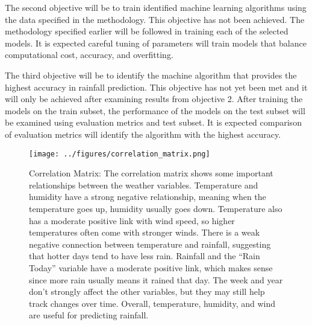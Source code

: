 \documentclass{article}
\begin{document}
The second objective will be to train identified machine learning algorithms using the
data specified in the methodology. This objective has not been achieved. The methodology
specified earlier will be followed in training each of the selected models. It is expected careful
tuning of parameters will train models that balance computational cost, accuracy, and
overfitting.

The third objective will be to identify the machine algorithm that provides the highest
accuracy in rainfall prediction. This objective has not yet been met and it will only be achieved
after examining results from objective 2. After training the models on the train subset, the
performance of the models on the test subset will be examined using evaluation metrics and
test subset. It is expected comparison of evaluation metrics will identify the algorithm with the
highest accuracy.


\begin{figure}[h]
\centering
\texttt{[image: ../figures/correlation\_matrix.png]} %
\caption{Correlation Matrix: The correlation matrix shows some important relationships between the weather variables. Temperature and humidity have a strong negative relationship, meaning when the temperature goes up, humidity usually goes down. Temperature also has a moderate positive link with wind speed, so higher temperatures often come with stronger winds. There is a weak negative connection between temperature and rainfall, suggesting that hotter days tend to have less rain. Rainfall and the “Rain Today” variable have a moderate positive link, which makes sense since more rain usually means it rained that day. The week and year don’t strongly affect the other variables, but they may still help track changes over time. Overall, temperature, humidity, and wind are useful for predicting rainfall.}
\label{fig:correlation_matrix}
\end{figure}
\end{document}
